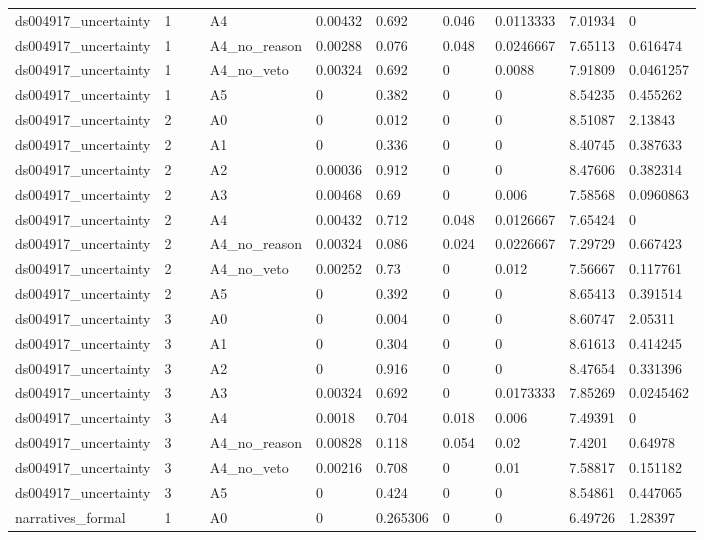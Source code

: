 \documentclass[11pt]{article}
\begin{document}
\begin{landscape}
\begin{longtable}{@{}L{0.120\linewidth}L{0.085\linewidth}L{0.085\linewidth}L{0.085\linewidth}L{0.085\linewidth}L{0.085\linewidth}L{0.085\linewidth}L{0.085\linewidth}L{0.085\linewidth}@{}}
ds004917\_uncertainty & 1 & A4 & 0.00432 & 0.692 & 0.046 & 0.0113333 & 7.01934 & 0 \\
ds004917\_uncertainty & 1 & A4\_no\_reason & 0.00288 & 0.076 & 0.048 & 0.0246667 & 7.65113 & 0.616474 \\
ds004917\_uncertainty & 1 & A4\_no\_veto & 0.00324 & 0.692 & 0 & 0.0088 & 7.91809 & 0.0461257 \\
ds004917\_uncertainty & 1 & A5 & 0 & 0.382 & 0 & 0 & 8.54235 & 0.455262 \\
ds004917\_uncertainty & 2 & A0 & 0 & 0.012 & 0 & 0 & 8.51087 & 2.13843 \\
ds004917\_uncertainty & 2 & A1 & 0 & 0.336 & 0 & 0 & 8.40745 & 0.387633 \\
ds004917\_uncertainty & 2 & A2 & 0.00036 & 0.912 & 0 & 0 & 8.47606 & 0.382314 \\
ds004917\_uncertainty & 2 & A3 & 0.00468 & 0.69 & 0 & 0.006 & 7.58568 & 0.0960863 \\
ds004917\_uncertainty & 2 & A4 & 0.00432 & 0.712 & 0.048 & 0.0126667 & 7.65424 & 0 \\
ds004917\_uncertainty & 2 & A4\_no\_reason & 0.00324 & 0.086 & 0.024 & 0.0226667 & 7.29729 & 0.667423 \\
ds004917\_uncertainty & 2 & A4\_no\_veto & 0.00252 & 0.73 & 0 & 0.012 & 7.56667 & 0.117761 \\
ds004917\_uncertainty & 2 & A5 & 0 & 0.392 & 0 & 0 & 8.65413 & 0.391514 \\
ds004917\_uncertainty & 3 & A0 & 0 & 0.004 & 0 & 0 & 8.60747 & 2.05311 \\
ds004917\_uncertainty & 3 & A1 & 0 & 0.304 & 0 & 0 & 8.61613 & 0.414245 \\
ds004917\_uncertainty & 3 & A2 & 0 & 0.916 & 0 & 0 & 8.47654 & 0.331396 \\
ds004917\_uncertainty & 3 & A3 & 0.00324 & 0.692 & 0 & 0.0173333 & 7.85269 & 0.0245462 \\
ds004917\_uncertainty & 3 & A4 & 0.0018 & 0.704 & 0.018 & 0.006 & 7.49391 & 0 \\
ds004917\_uncertainty & 3 & A4\_no\_reason & 0.00828 & 0.118 & 0.054 & 0.02 & 7.4201 & 0.64978 \\
ds004917\_uncertainty & 3 & A4\_no\_veto & 0.00216 & 0.708 & 0 & 0.01 & 7.58817 & 0.151182 \\
ds004917\_uncertainty & 3 & A5 & 0 & 0.424 & 0 & 0 & 8.54861 & 0.447065 \\
narratives\_formal & 1 & A0 & 0 & 0.265306 & 0 & 0 & 6.49726 & 1.28397 \\

\end{longtable}
\end{landscape}
\end{document}
